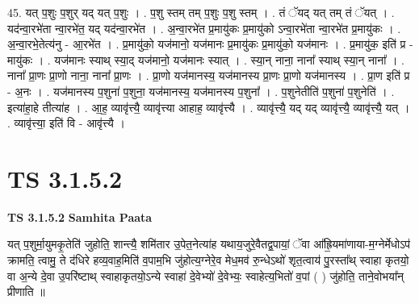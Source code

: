 \documentclass[17pt]{extarticle}
\begin{document}
45. यत् प॒शुः प॒शुर् यद् यत् प॒शुः । . प॒शु स्तम् तम् प॒शुः प॒शु स्तम् । . तं ॅयद् यत् तम् तं ॅयत् । . यद॑न्वा॒रभे॑ता न्वा॒रभे॑त॒ यद् यद॑न्वा॒रभे॑त । . अ॒न्वा॒रभे॑त प्र॒मायु॑कः प्र॒मायु॑को ऽन्वा॒रभे॑ता न्वा॒रभे॑त प्र॒मायु॑कः । . अ॒न्वा॒रभे॒तेत्य॑नु - आ॒रभे॑त । . प्र॒मायु॑को॒ यज॑मानो॒ यज॑मानः प्र॒मायु॑कः प्र॒मायु॑को॒ यज॑मानः । . प्र॒मायु॑क॒ इति॑ प्र - मायु॑कः । . यज॑मानः स्याथ् स्या॒द् यज॑मानो॒ यज॑मानः स्यात् । . स्या॒न् नाना॒ नाना᳚ स्याथ् स्या॒न् नाना᳚ । . नाना᳚ प्रा॒णः प्रा॒णो नाना॒ नाना᳚ प्रा॒णः । . प्रा॒णो यज॑मानस्य॒ यज॑मानस्य प्रा॒णः प्रा॒णो यज॑मानस्य । . प्रा॒ण इति॑ प्र - अ॒नः । . यज॑मानस्य प॒शुना॑ प॒शुना॒ यज॑मानस्य॒ यज॑मानस्य प॒शुना᳚ । . प॒शुनेतीति॑ प॒शुना॑ प॒शुनेति॑ । . इत्या॑हा॒हे तीत्या॑ह । . आ॒ह॒ व्यावृ॑त्त्यै॒ व्यावृ॑त्त्या आहाह॒ व्यावृ॑त्त्यै । . व्यावृ॑त्त्यै॒ यद् यद् व्यावृ॑त्त्यै॒ व्यावृ॑त्त्यै॒ यत् । . व्यावृ॑त्त्या॒ इति॑ वि - आवृ॑त्त्यै । \newline
\pagebreak
{}

\section{ TS 3.1.5.2 }

\textbf{TS 3.1.5.2 } \newline
\textbf{Samhita Paata} \newline

यत् प॒शुर्मा॒युमकृ॒तेति॑ जुहोति॒ शान्त्यै॒ शमि॑तार उ॒पेत॒नेत्या॑ह यथाय॒जुरे॒वैतद्व॒पायां॒ ॅवा आ᳚ह्रि॒यमा॑णाया-म॒ग्नेर्मेधोऽप॑ क्रामति॒ त्वामु॒ ते द॑धिरे हव्य॒वाह॒मिति॑ व॒पाम॒भि जु॑होत्य॒ग्नेरे॒व मेध॒मव॑ रु॒न्धेऽथो॑ शृत॒त्वाय॑ पु॒रस्ता᳚थ् स्वाहा कृतयो॒ वा अ॒न्ये दे॒वा उ॒परि॑ष्टाथ् स्वाहाकृतयो॒ऽन्ये स्वाहा॑ दे॒वेभ्यो॑ दे॒वेभ्यः॒ स्वाहेत्य॒भितो॑ व॒पां ( ) जु॑होति॒ ताने॒वोभया᳚न् प्रीणाति ॥ \newline
\end{document}
